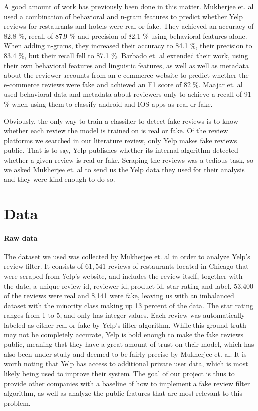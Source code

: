 A good amount of work has previously been done in this matter. Mukherjee et. al used a combination of behavioral and n-gram features to predict whether Yelp reviews for restaurants and hotels were real or fake. They achieved an accuracy of 82.8 \%, recall of 87.9 \% and precision of 82.1 \% using behavioral features alone. When adding n-grams, they increased their accuracy to 84.1 \%, their precision to 83.4 \%, but their recall fell to 87.1 \%. Barbado et. al extended their work, using their own behavioral features and linguistic features, as well as well as metadata about the reviewer accounts from an e-commerce website to predict whether the e-commerce reviews were fake and achieved an F1 score of 82 \%. Maajar et. al used behavioral data and metadata about reviewers only to achieve a recall of 91 \% when using them to classify android and IOS apps as real or fake. 

Obviously, the only way to train a classifier to detect fake reviews is to know whether each review the model is trained on is real or fake. Of the review platforms we searched in our literature review, only Yelp makes fake reviews public. That is to say, Yelp publishes whether its internal algorithm detected whether a given review is real or fake. Scraping the reviews was a tedious task, so we asked Mukherjee et. al to send us the Yelp data they used for their analysis and they were kind enough to do so. 

\section{Data}

\paragraph{Raw data} The dataset we used was collected by Mukherjee et. al in order to analyze Yelp's review filter. It consists of $61,541$ reviews of restaurants located in Chicago that were scraped from Yelp's website, and includes the review itself, together with the date, a unique review id, reviewer id, product id, star rating and label. 53,400 of the reviews were real and 8,141 were fake, leaving us with an imbalanced dataset with the minority class making up 13 percent of the data. The star rating ranges from 1 to 5, and only has integer values. Each review was automatically labeled as either real or fake by Yelp's filter algorithm. While this ground truth may not be completely accurate, Yelp is bold enough to make the fake reviews public, meaning that they have a great amount of trust on their model, which has also been under study and deemed to be fairly precise by Mukherjee et. al. It is worth noting that Yelp has access to additional private user data, which is most likely being used to improve their system. The goal of our project is thus to provide other companies with a baseline of how to implement a fake review filter algorithm, as well as analyze the public features that are most relevant to this problem. 

